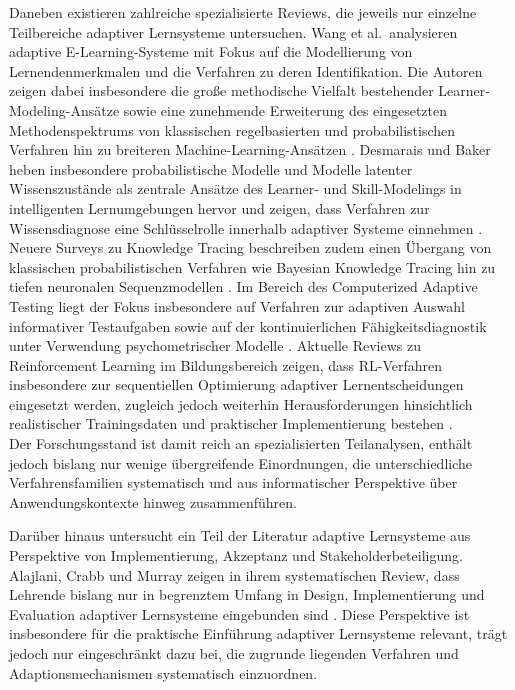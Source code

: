 Daneben existieren zahlreiche spezialisierte Reviews, die jeweils nur
einzelne Teilbereiche adaptiver Lernsysteme untersuchen. Wang et
al.~analysieren adaptive E-Learning-Systeme mit Fokus auf die
Modellierung von Lernendenmerkmalen und die Verfahren zu deren
Identifikation. Die Autoren zeigen dabei insbesondere die große
methodische Vielfalt bestehender Learner-Modeling-Ansätze sowie eine
zunehmende Erweiterung des eingesetzten Methodenspektrums von
klassischen regelbasierten und probabilistischen Verfahren hin zu
breiteren Machine-Learning-Ansätzen \citep{Wang2025}. Desmarais und
Baker heben insbesondere probabilistische Modelle und Modelle latenter
Wissenszustände als zentrale Ansätze des Learner- und Skill-Modelings in
intelligenten Lernumgebungen hervor und zeigen, dass Verfahren zur
Wissensdiagnose eine Schlüsselrolle innerhalb adaptiver Systeme
einnehmen \citep{Desmarais2012}. Neuere Surveys zu Knowledge Tracing
beschreiben zudem einen Übergang von klassischen probabilistischen
Verfahren wie Bayesian Knowledge Tracing hin zu tiefen neuronalen
Sequenzmodellen \citep{Abdelrahman2023}. Im Bereich des Computerized
Adaptive Testing liegt der Fokus insbesondere auf Verfahren zur
adaptiven Auswahl informativer Testaufgaben sowie auf der
kontinuierlichen Fähigkeitsdiagnostik unter Verwendung psychometrischer
Modelle \citep{Han2018, Liu2024}. Aktuelle Reviews zu Reinforcement
Learning im Bildungsbereich zeigen, dass RL-Verfahren insbesondere zur
sequentiellen Optimierung adaptiver Lernentscheidungen eingesetzt
werden, zugleich jedoch weiterhin Herausforderungen hinsichtlich
realistischer Trainingsdaten und praktischer Implementierung bestehen
\citep{Riedmann2025}.\\
Der Forschungsstand ist damit reich an spezialisierten Teilanalysen,
enthält jedoch bislang nur wenige übergreifende Einordnungen, die
unterschiedliche Verfahrensfamilien systematisch und aus informatischer
Perspektive über Anwendungskontexte hinweg zusammenführen.

Darüber hinaus untersucht ein Teil der Literatur adaptive Lernsysteme
aus Perspektive von Implementierung, Akzeptanz und
Stakeholderbeteiligung. Alajlani, Crabb und Murray zeigen in ihrem
systematischen Review, dass Lehrende bislang nur in begrenztem Umfang in
Design, Implementierung und Evaluation adaptiver Lernsysteme eingebunden
sind \citep{Alajlani2024}. Diese Perspektive ist insbesondere für die
praktische Einführung adaptiver Lernsysteme relevant, trägt jedoch nur
eingeschränkt dazu bei, die zugrunde liegenden Verfahren und
Adaptionsmechanismen systematisch einzuordnen.

